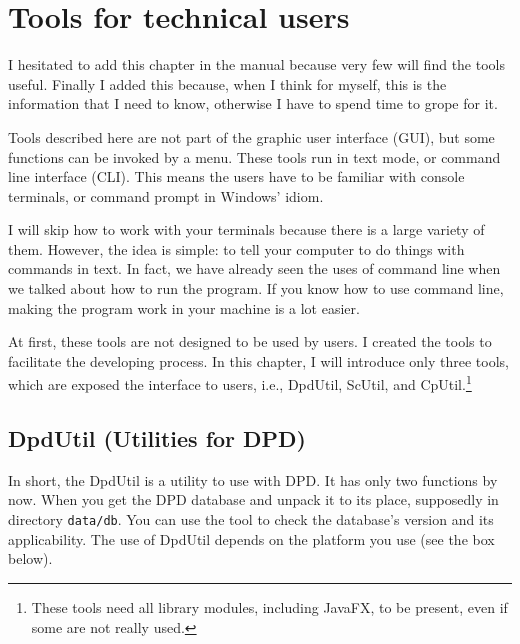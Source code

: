 \chapter{Tools for technical users}

I hesitated to add this chapter in the manual because very few will find the tools useful. Finally I added this because, when I think for myself, this is the information that I need to know, otherwise I have to spend time to grope for it.

Tools described here are not part of the graphic user interface (GUI), but some functions can be invoked by a menu. These tools run in text mode, or command line interface (CLI). This means the users have to be familiar with console terminals, or command prompt in Windows' idiom.

I will skip how to work with your terminals because there is a large variety of them. However, the idea is simple: to tell your computer to do things with commands in text. In fact, we have already seen the uses of command line when we talked about how to run the program. If you know how to use command line, making the program work in your machine is a lot easier.

At first, these tools are not designed to be used by users. I created the tools to facilitate the developing process. In this chapter, I will introduce only three tools, which are exposed the interface to users, i.e., DpdUtil, ScUtil, and CpUtil.\footnote{These tools need all library modules, including JavaFX, to be present, even if some are not really used.}

\section{DpdUtil (Utilities for DPD)}\label{sect:dpdutil}

In short, the DpdUtil is a utility to use with DPD. It has only two functions by now. When you get the DPD database and unpack it to its place, supposedly in directory \texttt{data/db}. You can use the tool to check the database's version and its applicability. The use of DpdUtil depends on the platform you use (see the box below).


